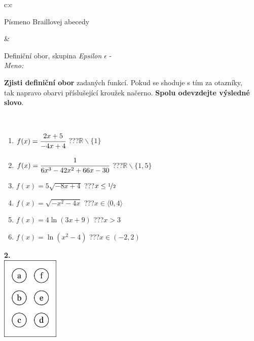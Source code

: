 \documentclass[10pt]{report}
\begin{document}
\begin{tabular}{c:c}
\begin{minipage}[c][104.5mm][t]{0.5\linewidth}
\begin{center}
\begin{minipage}{0.20\linewidth}
\begin{center}
{\small Písmeno Braillovej abecedy}
\end{center}
\end{minipage}
\end{center}
\end{minipage}
&
\begin{minipage}[c][104.5mm][t]{0.5\linewidth}
\begin{center}
\vspace{7mm}
{\huge Definiční obor, skupina \textit{Epsilon $\epsilon$} -}\\[5mm]
\textit{Meno:}\phantom{xxxxxxxxxxxxxxxxxxxxxxxxxxxxxxxxxxxxxxxxxxxxxxxxxxxxxxxxxxxxxxxxx}\\[5mm]
\begin{minipage}{0.95\linewidth}
\textbf{Zjisti definiční obor} zadaných funkcí. Pokud se shoduje s tím za otazníky,\\tak napravo obarvi příslušející kroužek načerno. \textbf{Spolu odevzdejte výsledné slovo}.
\end{minipage}
\\[1mm]
\begin{minipage}{0.79\linewidth}
\begin{center}
\begin{varwidth}{\linewidth}
\begin{enumerate}
\normalsizerrr
\item $f(x)=\cfrac{2x+5}{-4x+4}$\quad \dotfill\; ???\;\dotfill \quad $\mathbb{R}\smallsetminus\{1\}$
\item $f(x)=\cfrac{1}{6x^3-42x^2+66x-30}$\quad \dotfill\; ???\;\dotfill \quad $\mathbb{R}\smallsetminus\{1,5\}$
\item $f(x)=5\sqrt{-8x+4}$\quad \dotfill\; ???\;\dotfill \quad $x\leq\nicefrac{1}{2}$
\item $f(x)=\sqrt{-x^2-4x}$\quad \dotfill\; ???\;\dotfill \quad $x\in\langle0 , 4\rangle$
\item $f(x)=4\ln{(3x+9)}$\quad \dotfill\; ???\;\dotfill \quad $x>3$
\item $f(x)=\ln{(x^2-4)}$\quad \dotfill\; ???\;\dotfill \quad $x\in(-2 , 2)$
\end{enumerate}
\end{varwidth}
\end{center}
\end{minipage}
\begin{minipage}{0.20\linewidth}
\begin{center}
{\Huge\bfseries 2.} \\[2mm]
\includegraphics[height=40mm]{../images/braille.png}

\end{center}
\end{minipage}
\end{center}
\end{minipage}
\end{tabular}
\end{document}

